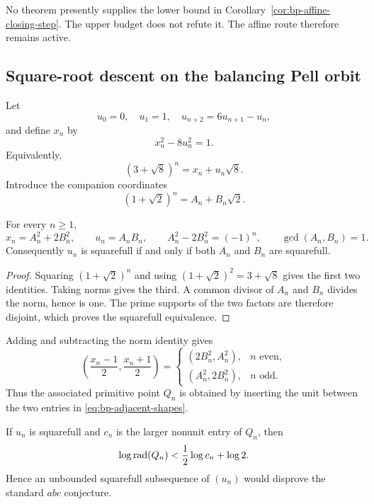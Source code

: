 No theorem presently supplies the lower bound in
Corollary~\ref{cor:bp-affine-closing-step}.  The upper budget does not refute
it.  The affine route therefore remains active.

\subsection{Square-root descent on the balancing Pell orbit}

Let
\[
 u_0=0,\quad u_1=1,\quad u_{n+2}=6u_{n+1}-u_n,
\]
and define $x_n$ by
\[
                         x_n^2-8u_n^2=1.
\]
Equivalently,
\[
                         (3+\sqrt8)^n=x_n+u_n\sqrt8.
\]
Introduce the companion coordinates
\[
                         (1+\sqrt2)^n=A_n+B_n\sqrt2.
\]

\begin{theorem}
\label{thm:bp-square-root-factorization}
For every $n\geq1$,
\begin{equation}\label{eq:bp-square-root-factorization}
 x_n=A_n^2+2B_n^2,\qquad u_n=A_nB_n,\qquad
 A_n^2-2B_n^2=(-1)^n,\qquad \gcd(A_n,B_n)=1.
\end{equation}
Consequently $u_n$ is squarefull if and only if both $A_n$ and $B_n$ are
squarefull.
\end{theorem}

\begin{proof}
Squaring $(1+\sqrt2)^n$ and using
$(1+\sqrt2)^2=3+\sqrt8$ gives the first two identities.  Taking norms gives
the third.  A common divisor of $A_n$ and $B_n$ divides the norm, hence is
one.  The prime supports of the two factors are therefore disjoint, which
proves the squarefull equivalence.
\end{proof}

Adding and subtracting the norm identity gives
\begin{equation}\label{eq:bp-adjacent-shapes}
 \left(\frac{x_n-1}{2},\frac{x_n+1}{2}\right)=
 \begin{cases}
  (2B_n^2,A_n^2),&n\text{ even},\\
  (A_n^2,2B_n^2),&n\text{ odd}.
 \end{cases}
\end{equation}
Thus the associated primitive point $Q_n$ is obtained by inserting the unit
between the two entries in \eqref{eq:bp-adjacent-shapes}.

\begin{theorem}
\label{thm:bp-half-slope}
If $u_n$ is squarefull and $c_n$ is the larger nonunit entry of $Q_n$, then
\begin{equation}\label{eq:bp-half-slope}
              \log\operatorname{rad}(Q_n)<\frac12\log c_n+\log2.
\end{equation}
Hence an unbounded squarefull subsequence of $(u_n)$ would disprove the
standard $abc$ conjecture.
\end{theorem}

